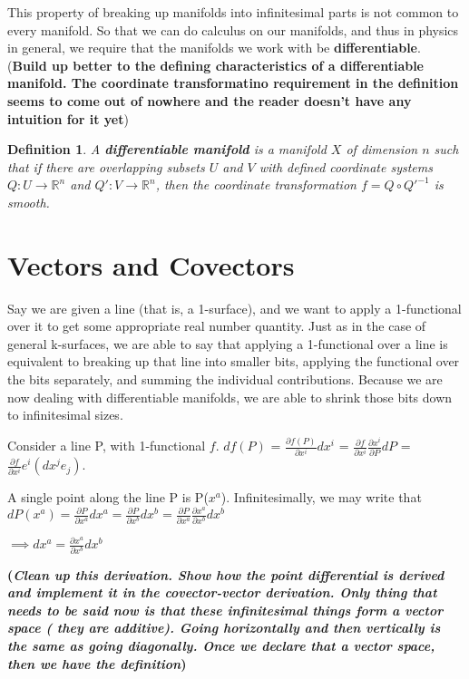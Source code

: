 \documentclass{book}
\newtheorem{defn}[equation]{Definition}
\begin{document}
This property of breaking up manifolds into infinitesimal parts is not common to every manifold. So that we can do calculus on our manifolds, and thus in physics in general, we require that the manifolds we work with be \textbf{differentiable}. (\textbf{Build up better to the defining characteristics of a differentiable manifold. The coordinate transformatino requirement in the definition seems to come out of nowhere and the reader doesn't have any intuition for it yet})


\begin{defn}
	A \textbf{differentiable manifold} is a manifold $X$ of dimension $n$ such that if there are overlapping subsets $U$ and $V$ with defined coordinate systems $Q: U \to \mathbb{R}^n$ and $Q': V \to \mathbb{R}^n$, then the coordinate transformation $f = Q \circ Q'^{-1}$ is smooth. 
\end{defn}





\section{Vectors and Covectors}


Say we are given a line (that is, a 1-surface), and we want to apply a 1-functional over it to get some appropriate real number quantity. Just as in the case of general k-surfaces, we are able to say that applying a 1-functional over a line is equivalent to breaking up that line into smaller bits, applying the functional over the bits separately, and summing the individual contributions. Because we are now dealing with differentiable manifolds, we are able to shrink those bits down to infinitesimal sizes. 

Consider a line P, with 1-functional $f$. $ df(P)$ = $ \frac{\partial f(P)}{{\partial x^i}} dx^i$ = $ \frac{\partial f}{\partial x^i}\frac{\partial x^i}{\partial P}dP$ = $\frac{{\partial f}}{{\partial x^i}} e^i (dx^j e_j)$. 

A single point along the line P is P($x^a$). Infinitesimally, we may write that  
$dP(x^a) = \frac{\partial P}{\partial x^a} dx^a = \frac{\partial P}{\partial x^b} dx^b = \frac{\partial P}{\partial x^a}\frac{\partial x^a}{\partial x^b} dx^b$

$\implies dx^a = \frac{\partial x^a}{\partial x^b}dx^b $

\textbf{(\emph{Clean up this derivation. Show how the point differential is derived and implement it in the covector-vector derivation. Only thing that needs to be said now is that these infinitesimal things form a vector space ( they are additive). Going horizontally and then vertically is the same as going diagonally. Once we declare that a vector space, then we have the definition})}
\end{document}

